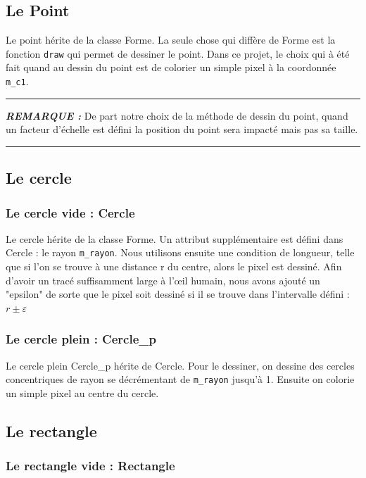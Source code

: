 \documentclass[11pt]{article}
\newenvironment{rmq}[1] {\noindent\HRule\par\vspace{5pt}\textbf{\textit{REMARQUE : }}#1}{\\\HRule\par\vspace{5pt}}
\newcommand{\HRule}{\rule{\linewidth}{0.5mm}}
\begin{document}
\subsection{Le Point}

Le point hérite de la classe Forme. La seule chose qui diffère de Forme est la fonction \texttt{draw} qui permet de dessiner le point. Dans ce projet, le choix qui à été fait quand au dessin du point est de colorier un simple pixel à la coordonnée \texttt{m\_c1}. 

\begin{rmq}
    De part notre choix de la méthode de dessin du point, quand un facteur d'échelle est défini la position du point sera impacté mais pas sa taille. 
\end{rmq}

\subsection{Le cercle}

\subsubsection{Le cercle vide : Cercle}

Le cercle hérite de la classe Forme. Un attribut supplémentaire est défini dans Cercle : le rayon \texttt{m\_rayon}. Nous utilisons ensuite une condition de longueur, telle que si l'on se trouve à une distance r du centre, alors le pixel est dessiné. Afin d'avoir un tracé suffisamment large à l’œil humain, nous avons ajouté un "epsilon" de sorte que le pixel soit dessiné si il se trouve dans l’intervalle défini : $r \pm \varepsilon$

\subsubsection{Le cercle plein : Cercle\_p}

Le cercle plein Cercle\_p hérite de Cercle. Pour le dessiner, on dessine des cercles concentriques de rayon se décrémentant de \texttt{m\_rayon} jusqu'à 1. Ensuite on colorie un simple pixel au centre du cercle. 

\subsection{Le rectangle}

\subsubsection{Le rectangle vide : Rectangle}
\end{document}
